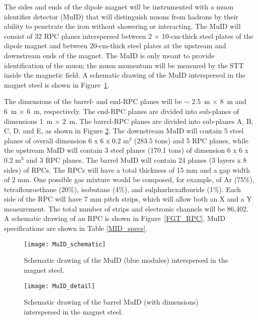 \documentclass[aps,prl,preprint,groupedaddress]{revtex4}
\begin{document}
The sides and ends of the dipole magnet will be instrumented
with a muon identifier
detector (MuID) that will distinguish muons from hadrons by their ability 
to penetrate the iron without showering or interacting.
The MuID will consist of 32 RPC planes
interspersed between 2 $\times$ 10-cm-thick steel plates of the 
dipole magnet and between 20-cm-thick steel plates at the upstream and
downstream ends of the magnet. 
The MuID is only meant to provide %
identification of the 
muon; the muon momentum %
will be measured by the STT inside the 
magnetic field. A schematic drawing of the MuID 
interspersed in the magnet steel is shown in Figure~\ref{FGT_MuID}.

The dimensions of the barrel- and end-RPC planes will be $\sim$ 2.5~m $\times$ 8~m and
6~m $\times$ 6~m, respectively. The end-RPC planes are divided into 
sub-planes of dimensions 1~m $\times$ 2~m. The barrel-RPC planes are divided into
sub-planes A, B, C, D, and E, as shown in Figure \ref{MuID_detail}. 
The downstream MuID will contain 5 steel planes of 
overall dimension
6 x 6 x 0.2 m$^3$ (283.5 tons)
and 5 RPC planes, while the upstream MuID will contain 3 steel
planes (170.1 tons) of dimension 6 x 6 x 0.2 m$^3$ and 3 RPC planes. The barrel MuID will contain
24 planes (3 layers x 8 sides) of RPCs. The RPCs will have a total thickness 
of 15 mm and a gap width of 2 mm. One possible gas mixture would be composed, for example,
of Ar (75\%), tetraflouroethane (20\%), isobutane (4\%),
and sulphurhexaflouride (1\%). Each side of the RPC will have 7 mm pitch strips, which will
allow both an X and a Y measurement. The total number of strips and electronic channels will
be 86,402. A schematic drawing of an RPC is shown in Figure~\ref{FGT_RPC}.
MuID specifications are shown in Table \ref{MID_specs}.

\begin{figure}[htp]
\begin{center}
\texttt{[image: MuID\_schematic]}
\caption{\label{FGT_MuID} Schematic drawing of the MuID (blue modules) interspersed in the magnet steel.}
\end{center}
\end{figure}

\begin{figure}[htp]
\begin{center}
\texttt{[image: MuID\_detail]}
\caption{\label{MuID_detail} Schematic drawing of the barrel MuID (with dimensions) 
interspersed in the magnet steel.}
\end{center}
\end{figure}
\end{document}
